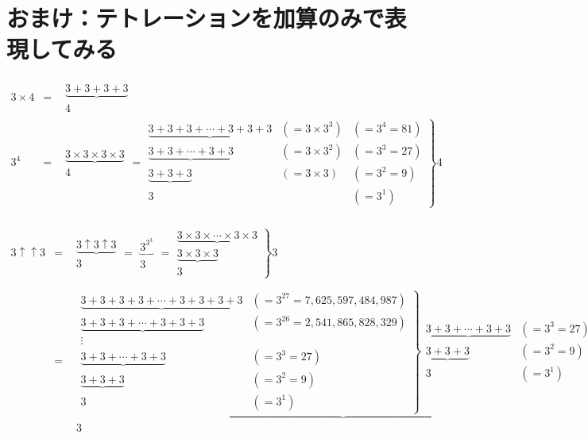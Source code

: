 \documentclass[a4j,fleqn,10pt]{jarticle}
\begin{document}
\section{おまけ：テトレーションを加算のみで表現してみる}
\begin{eqnarray}
3 \times 4&=&
\left .
\begin{array} {c}
\underbrace {3+3+3+3} \\
4
\end{array}
\right .
\\
3 ^ 4&=&
\left .
\begin{array} {c}
\underbrace {3 \times 3 \times 3 \times 3} \\
4
\end{array}
\right .
=
\left .
\begin{array} {cll}
\underbrace {3+3+3+ \dotsb +3+3+3}&(=3 \times 3^3)&(=3^4=81)\\
\underbrace {3+3+ \dotsb +3+3}&(=3 \times 3^2)&(=3^3=27)\\
\underbrace {3+3+3} &(=3 \times 3)&(=3^2=9)\\
3&&(=3^1)
\end{array}
\right \} 
4
\end{eqnarray}
\\
\footnotesize{
\begin{eqnarray}
3 \uparrow \uparrow 3&=&
\left .
\begin{array} {c}
\underbrace {
3 \uparrow 3 \uparrow 3
}\\
3 
\end{array}
\right . 
=
\left .
\begin{array} {c}
\underbrace {
3^{3^3}
}\\
3 
\end{array}
\right . 
%
=
\left . 
\begin{array} {c}
\underbrace {3 \times 3 \times \dotsb \times 3 \times 3 } \\
\underbrace {3 \times 3 \times 3 } \\
3
\end{array}
\right \} 3
\\
%
\nonumber \\
&=&
\begin{array} {c}
\underbrace {
\left .
\begin{array} {cr}
\underbrace {3+3+3+3+ \dotsb +3+3+3+3}&(=3^{27}=7{,}625{,}597{,}484{,}987)\\
\underbrace {3+3+3+ \dotsb +3+3+3}&(=3^{26}=2{,}541{,}865{,}828{,}329)\\
\vdots \\
\underbrace {3+3+ \dotsb +3+3}&(=3^3=27)\\
\underbrace {3+3+3} &(=3^2=9)\\
3&(=3^1)
\end{array}
\right \}
\left .
\begin{array} {cr}
\underbrace {3+3+ \dotsb +3+3}&(=3^3=27)\\
\underbrace {3+3+3} &(=3^2=9)\\
3&(=3^1)
\end{array}
\right \} 
3
} \\
3
\end{array}
\end{eqnarray}
}
\end{document}
